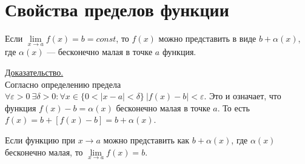 \documentclass{article}
\begin{document}
\section{Свойства пределов функции}
\begin{lemma}
    Если \(\lim\limits_{x \to a}f(x) = b = const\), то \(f(x)\) можно представить в виде \(\displaystyle b + \alpha(x)\), где \(\displaystyle \alpha(x)\) --- бесконечно малая в точке \(a\) функция.     
\end{lemma}
\noindent
\underline{Доказательство.}\\
Согласно определению предела \(\displaystyle \forall \varepsilon > 0\ \exists \delta > 0: \forall x \in \{0 < \vert x - a \vert < \delta \}\ \vert f(x) - b \vert < \varepsilon\). Это и означает, что функция \(\displaystyle f(x) - b = \alpha(x)\) бесконечно малая в точке \(a\). То есть
\(\displaystyle f(x) = b + [f(x) - b] = b + \alpha(x)\).
\begin{lemma}[Обратная]
    Если функцию при \(x \to a\) можно представить как \(\displaystyle b + \alpha(x)\), где \(\displaystyle \alpha(x)\) бесконечно малая, то \(\displaystyle \lim\limits_{x \to a}f(x) = b\).  
\end{lemma}    
\end{document}
